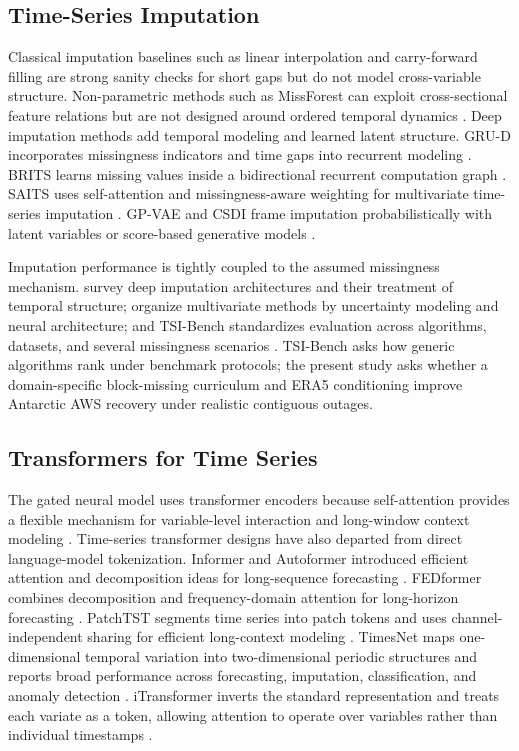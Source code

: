\subsection{Time-Series Imputation}
Classical imputation baselines such as linear interpolation and carry-forward filling are strong sanity checks for short gaps but do not model cross-variable structure. Non-parametric methods such as MissForest can exploit cross-sectional feature relations but are not designed around ordered temporal dynamics \citep{stekhoven2012missforest}. Deep imputation methods add temporal modeling and learned latent structure. GRU-D incorporates missingness indicators and time gaps into recurrent modeling \citep{che2018grud}. BRITS learns missing values inside a bidirectional recurrent computation graph \citep{cao2018brits}. SAITS uses self-attention and missingness-aware weighting for multivariate time-series imputation \citep{du2023saits}. GP-VAE and CSDI frame imputation probabilistically with latent variables or score-based generative models \citep{fortuin2020gpvae,tashiro2021csdi}.

Imputation performance is tightly coupled to the assumed missingness mechanism. \citet{fang2020imputationsurvey} survey deep imputation architectures and their treatment of temporal structure; \citet{wang2024imputationsurvey} organize multivariate methods by uncertainty modeling and neural architecture; and TSI-Bench standardizes evaluation across algorithms, datasets, and several missingness scenarios \citep{du2024tsibench}. TSI-Bench asks how generic algorithms rank under benchmark protocols; the present study asks whether a domain-specific block-missing curriculum and ERA5 conditioning improve Antarctic AWS recovery under realistic contiguous outages.

\subsection{Transformers for Time Series}
The gated neural model uses transformer encoders because self-attention provides a flexible mechanism for variable-level interaction and long-window context modeling \citep{vaswani2017attention}. Time-series transformer designs have also departed from direct language-model tokenization. Informer and Autoformer introduced efficient attention and decomposition ideas for long-sequence forecasting \citep{zhou2021informer,wu2021autoformer}. FEDformer combines decomposition and frequency-domain attention for long-horizon forecasting \citep{zhou2022fedformer}. PatchTST segments time series into patch tokens and uses channel-independent sharing for efficient long-context modeling \citep{nie2023patchtst}. TimesNet maps one-dimensional temporal variation into two-dimensional periodic structures and reports broad performance across forecasting, imputation, classification, and anomaly detection \citep{wu2023timesnet}. iTransformer inverts the standard representation and treats each variate as a token, allowing attention to operate over variables rather than individual timestamps \citep{liu2024itransformer}.

